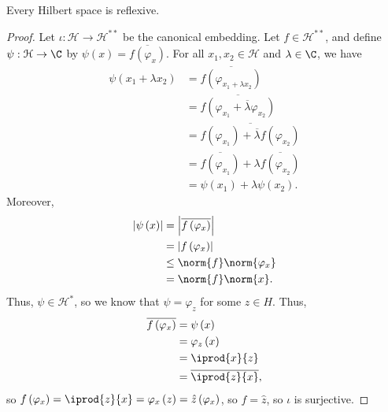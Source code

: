 \documentclass[10pt]{mypackage}
\begin{document}
\begin{theorem}
  Every Hilbert space is reflexive.
\end{theorem}
\begin{proof}
  Let $\iota: \mathcal{H}\rightarrow \mathcal{H}^{\ast\ast}$ be the canonical embedding. Let $f\in \mathcal{H}^{\ast\ast}$, and define $\psi: \mathcal{H}\rightarrow \C$ by $\psi(x) = \overline{f\left(\varphi_x\right)}$. For all $x_1,x_2\in \mathcal{H}$ and $\lambda\in \C$, we have
  \begin{align*}
    \psi\left(x_1 + \lambda x_2\right) &= \overline{f\left(\varphi_{x_1 + \lambda x_2}\right)}\\
                                       &= \overline{f\left(\varphi_{x_1} + \overline{\lambda}\varphi_{x_2}\right)}\\
                                       &= \overline{f\left(\varphi_{x_1}\right) + \overline{\lambda}f\left(\varphi_{x_2}\right)}\\
                                       &= \overline{f\left(\varphi_{x_1}\right)} + \lambda \overline{f\left(\varphi_{x_2}\right)}\\
                                       &= \psi\left(x_1\right) + \lambda \psi\left(x_2\right).
  \end{align*}
  Moreover,
  \begin{align*}
    \left\vert \psi\left(x\right) \right\vert &= \left\vert \overline{f\left(\varphi_{x}\right)} \right\vert\\
                                              &= \left\vert f\left(\varphi_x\right) \right\vert\\
                                              &\leq \norm{f}\norm{\varphi_x}\\
                                              &= \norm{f}\norm{x}.
  \end{align*}
  Thus, $\psi\in \mathcal{H}^{\ast}$, so we know that $\psi = \varphi_{z}$ for some $z\in H$. Thus,
  \begin{align*}
    \overline{f\left(\varphi_x\right)} &= \psi\left(x\right)\\
                                       &= \varphi_z\left(x\right)\\
                                       &= \iprod{x}{z}\\
                                       &= \overline{ \iprod{z}{x} },
  \end{align*}
  so $f\left(\varphi_x\right) = \iprod{z}{x} = \varphi_x\left(z\right) = \hat{z}\left(\varphi_x\right)$, so $f = \hat{z}$, so $\iota$ is surjective.
\end{proof}
\end{document}

